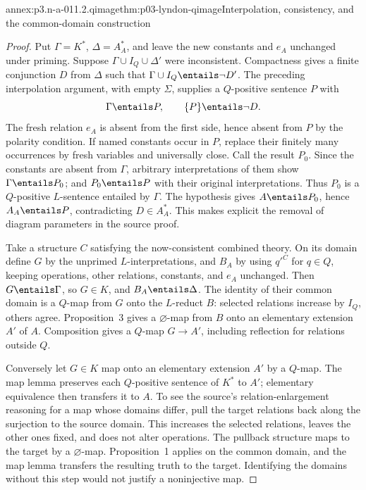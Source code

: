 \begin{annexitem}{annex:p3.n-a-011.2.qimage}{thm:p03-lyndon-qimage}{Interpolation, consistency, and the common-domain construction}
\begin{proof}
Put \(\Gamma=K^*\), \(\Delta=A_A^*\), and leave the new constants
and \(e_A\) unchanged under priming. Suppose
\(\Gamma\cup I_Q\cup\Delta'\) were inconsistent. Compactness gives
a finite conjunction \(D\) from \(\Delta\) such that
\(\Gamma\cup I_Q\entails\neg D'\). The preceding interpolation
argument, with empty \(\Sigma\), supplies a \(Q\)-positive sentence
\(P\) with
\[
 \Gamma\entails P,\qquad \{P\}\entails\neg D.
\]
The fresh relation \(e_A\) is absent from the first side, hence absent
from \(P\) by the polarity condition. If named constants occur in
\(P\), replace their finitely many occurrences by fresh variables and
universally close. Call the result \(P_0\). Since the constants are
absent from \(\Gamma\), arbitrary interpretations of them show
\(\Gamma\entails P_0\); and \(P_0\entails P\) with their original
interpretations. Thus \(P_0\) is a \(Q\)-positive \(L\)-sentence
entailed by \(\Gamma\). The hypothesis gives \(A\entails P_0\),
hence \(A_A\entails P\), contradicting \(D\in A_A^*\).
This makes explicit the removal of diagram parameters in the source proof.

Take a structure \(C\) satisfying the now-consistent combined theory.
On its domain define \(G\) by the unprimed \(L\)-interpretations,
and \(B_A\) by using \(q'^C\) for \(q\in Q\), keeping operations,
other relations, constants, and \(e_A\) unchanged. Then \(G\entails
\Gamma\), so \(G\in K\), and \(B_A\entails\Delta\).
The identity of their common domain is a \(Q\)-map from \(G\) onto
the \(L\)-reduct \(B\): selected relations increase by \(I_Q\),
others agree. Proposition~3 gives a \(\varnothing\)-map from \(B\)
onto an elementary extension \(A'\) of \(A\). Composition gives a
\(Q\)-map \(G\to A'\), including reflection for relations outside
\(Q\).

Conversely let \(G\in K\) map onto an elementary extension \(A'\)
by a \(Q\)-map. The map lemma preserves each \(Q\)-positive sentence
of \(K^*\) to \(A'\); elementary equivalence then transfers it to
\(A\). To see the source's relation-enlargement reasoning for a map
whose domains differ, pull the target relations back along the surjection
to the source domain. This increases the selected relations, leaves the
other ones fixed, and does not alter operations. The pullback structure
maps to the target by a \(\varnothing\)-map. Proposition~1 applies
on the common domain, and the map lemma transfers the resulting truth
to the target. Identifying the domains without this step would not
justify a noninjective map.
\end{proof}
\end{annexitem}


